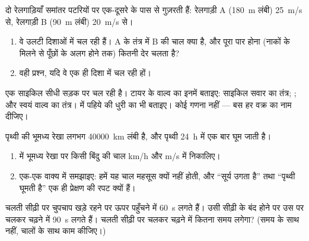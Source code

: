 \begin{exercise}[$\star\star$]\label{exo:g10:relative-motion:8}
दो रेलगाड़ियाँ समांतर पटरियों पर एक-दूसरे के पास से गुज़रती हैं:
रेलगाड़ी A (\qty{180}{m} लंबी) \qty{25}{m/s} से, रेलगाड़ी B (\qty{90}{m} लंबी) \qty{20}{m/s}
से।
\begin{enumerate}
  \item वे उलटी दिशाओं में चल रही हैं। A के तंत्र में B की चाल क्या है,
        और पूरा पार होना (नाकों के मिलने से पूँछों के अलग होने तक)
        कितनी देर चलता है?
  \item वही प्रश्न, यदि वे एक ही दिशा में चल रही हों।
\end{enumerate}
\end{exercise}

\begin{exercise}[$\star\star$]\label{exo:g10:relative-motion:9}
एक साइकिल सीधी सड़क पर चल रही है। टायर के वाल्व का  इनमें
बताइए: साइकिल सवार का तंत्र; ; और स्वयं वाल्व
का तंत्र।  में पहिये की धुरी का 
भी बताइए। कोई गणना नहीं --- बस हर वक्र का नाम दीजिए।
\end{exercise}

\begin{exercise}[$\star\star$]\label{exo:g10:relative-motion:10}
पृथ्वी की भूमध्य रेखा लगभग \qty{40000}{km} लंबी है, और पृथ्वी \qty{24}{h} में एक बार
घूम जाती है।
\begin{enumerate}
  \item {} में भूमध्य रेखा पर किसी बिंदु की चाल
        \unit{km/h} और \unit{m/s} में निकालिए।
  \item एक-एक वाक्य में समझाइए: हमें यह चाल महसूस क्यों नहीं होती, और
        ``सूर्य उगता है'' तथा ``पृथ्वी घूमती है'' एक ही प्रेक्षण की
        रपट क्यों हैं।
\end{enumerate}
\end{exercise}

\begin{exercise}[$\star\star$]\label{exo:g10:relative-motion:11}
चलती सीढ़ी पर चुपचाप खड़े रहने पर ऊपर पहुँचने में \qty{60}{s} लगते हैं। उसी
सीढ़ी के बंद होने पर उस पर चलकर चढ़ने में \qty{90}{s} लगते हैं। चलती सीढ़ी
पर चलकर चढ़ने में कितना समय लगेगा? (समय के साथ नहीं, चालों के साथ काम
कीजिए।)
\end{exercise}


